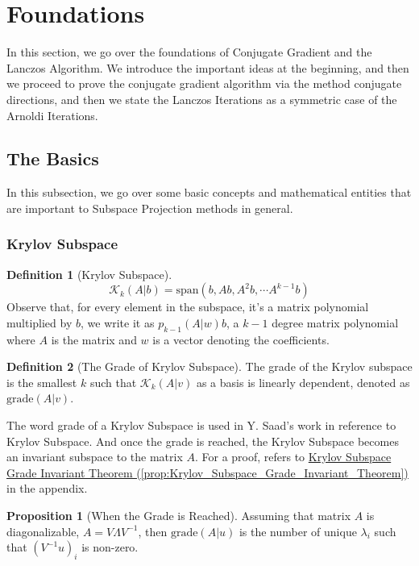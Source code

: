 \documentclass[]{article}
\theoremstyle{definition}
\newtheorem{prop}{Proposition}[section]  %
\newtheorem{definition}{Definition}      %
\begin{document}
\newpage
\section{Foundations}
    In this section, we go over the foundations of Conjugate Gradient and the Lanczos Algorithm. We introduce the important ideas at the beginning, and then we proceed to prove the conjugate gradient algorithm via the method conjugate directions, and then we state the Lanczos Iterations as a symmetric case of the Arnoldi Iterations. 
    \subsection{The Basics}
        In this subsection, we go over some basic concepts and mathematical entities that are important to Subspace Projection methods in general. 
        \subsubsection{Krylov Subspace}
            \begin{definition}[Krylov Subspace]
                $$
                \mathcal{K}_k(A|b) = \text{span}( b, Ab, A^2b, \cdots A^{k - 1}b)
                $$
                Observe that, for every element in the subspace, it's a matrix polynomial multiplied by $b$, we write it as $p_{k-1}(A|w)b$, a $k-1$ degree matrix polynomial where $A$ is the matrix and $w$ is a vector denoting the coefficients. 
            \end{definition}
            \begin{definition}[The Grade of Krylov Subspace]
                The grade of the Krylov subspace is the smallest $k$ such that $\mathcal K_{k}(A|v)$ as a basis is linearly dependent, denoted as $\text{grade}(A|v)$. 
            \end{definition}
            The word grade of a Krylov Subspace is used in Y. Saad's work\cite{book:saad_sparse_linear} in reference to Krylov Subspace. And once the grade is reached, the Krylov Subspace becomes an invariant subspace to the matrix $A$. For a proof, refers to \hyperref[prop:Krylov_Subspace_Grade_Invariant_Theorem]{Krylov Subspace Grade Invariant Theorem (\ref*{prop:Krylov_Subspace_Grade_Invariant_Theorem})} in the appendix. 
            \begin{prop}[When the Grade is Reached]\label{prop:When_the_Grade_is_Reached}
                Assuming that matrix $A$ is diagonalizable, $A = V\Lambda V^{-1}$, then $\text{grade}(A|u)$ is the number of unique $\lambda_i$ such that $(V^{-1}u)_i$ is non-zero. 
            \end{prop}
\end{document}
